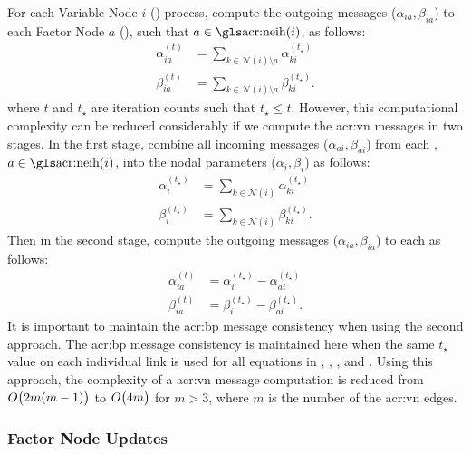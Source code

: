 For each Variable Node $i$ () process, compute the outgoing messages ($\alpha_{ia}, \beta_{ia}$) to each Factor Node $a$ (), such that $a\in \neih{i}$, as follows:
\begin{align}
	\alpha_{ia}^{(t)} & = \sum_{k\in\mathcal{N}(i)\setminus a}\alpha_{ki}^{(t_\star)} \label{eqn:vnaSumMin}\\
	\beta_{ia}^{(t)} & =\sum_{k\in\mathcal{N}(i)\setminus a}\beta_{ki}^{(t_\star)}. \label{eqn:vnbSumMin}
\end{align}
where $t$ and $t_\star$ are iteration counts such that $t_\star \leq t$.
However, this computational complexity can be reduced considerably if we compute the \gls{acr:vn} messages in two stages.
In the first stage, combine all incoming messages ($\alpha_{ai}, \beta_{ai}$) from each , $a\in \neih{i}$, into the nodal parameters ($\alpha_i, \beta_i$) as follows:
\begin{align}
	\alpha_{i}^{(t_\star)} & = \sum_{k\in\mathcal{N}(i)}\alpha_{ki}^{(t_\star)} \label{eqn:vnaSum}\\
	\beta_{i}^{(t_\star)} & =\sum_{k\in\mathcal{N}(i)}\beta_{ki}^{(t_\star)}. \label{eqn:vnbSum}
\end{align}
Then in the second stage, compute the outgoing messages ($\alpha_{ia}, \beta_{ia}$) to each  as follows:
\begin{align}
	\alpha_{ia}^{(t)} & =\alpha_{i}^{(t_\star)}-\alpha_{ai}^{(t_\star)} \label{eqn:vna}\\
	\beta_{ia}^{(t)} & =\beta_{i}^{(t_\star)}-\beta_{ai}^{(t_\star)}. \label{eqn:vnb}
\end{align}
It is important to maintain the \gls{acr:bp} message consistency when using the second approach.
The \gls{acr:bp} message consistency is maintained here when the same $t_\star$ value on each individual link is used for all equations in , , , and .  
Using this approach, the complexity of a \gls{acr:vn} message computation is reduced from $ O\bigl(2m(m-1)\bigr)$ to $ O\bigl(4m\bigr)$ for $m>3$, where $m$ is the number of the \gls{acr:vn} edges.


\subsubsection{Factor Node Updates}


